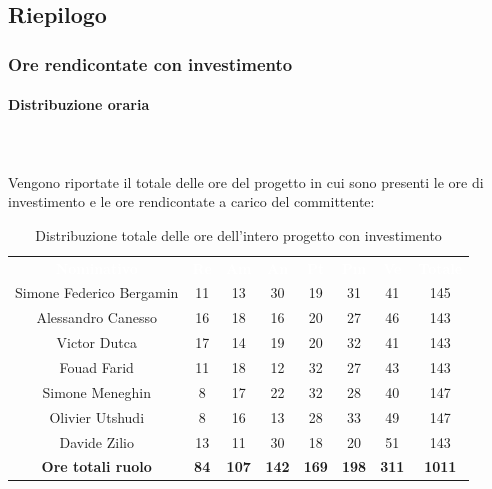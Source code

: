 \subsection{Riepilogo}
\subsubsection{Ore rendicontate con investimento}
\paragraph{Distribuzione oraria} \mbox{} \\ \mbox{} \\
Vengono riportate il totale delle ore del progetto in cui sono presenti le ore di investimento e le
ore rendicontate a carico del committente:

\begin{table}[H]
\centering\renewcommand{\arraystretch}{1.5}
\caption{Distribuzione totale delle ore dell'intero progetto con investimento}
\vspace{0.2cm}
\begin{tabular}{ c c c c c c c c }
\rowcolor{redafk}
\textcolor{white}{\textbf{Nominativo}} & \textcolor{white}{\textbf{Re}} & 
\textcolor{white}{\textbf{Am}} & \textcolor{white}{\textbf{An}} &
\textcolor{white}{\textbf{Pt}} & \textcolor{white}{\textbf{Pm}} &
\textcolor{white}{\textbf{Ve}} & \textcolor{white}{\textbf{Totale}} \\
Simone Federico Bergamin 	& 11 	& 13 	& 30 	& 19 	& 31 	& 41 	& 145 \\
Alessandro Canesso 			& 16 	& 18 	& 16 	& 20 	& 27 	& 46 	& 143 \\
Victor Dutca 				& 17	& 14 	& 19 	& 20 	& 32 	& 41 	& 143 \\
Fouad Farid					& 11	& 18 	& 12 	& 32 	& 27 	& 43 	& 143 \\
Simone Meneghin 			& 8 	& 17 	& 22 	& 32 	& 28 	& 40 	& 147 \\
Olivier Utshudi 			& 8 	& 16 	& 13 	& 28 	& 33 	& 49 	& 147 \\
Davide Zilio 				& 13 	& 11 	& 30 	& 18 	& 20 	& 51 	& 143 \\
\rowcolor{lastrowcolor}
\textbf{Ore totali ruolo} & \textbf{84} & \textbf{107} & \textbf{142} & \textbf{169} & \textbf{198} & \textbf{311} & \textbf{1011} \\
\end{tabular}
\end{table}

